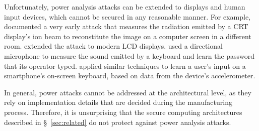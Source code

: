 Unfortunately, power analysis attacks can be extended to displays and human
input devices, which cannot be secured in any reasonable manner. For example,
\cite{van1985monitorpa} documented a very early attack that measures the
radiation emitted by a CRT display's ion beam to reconstitute the image on a
computer screen in a different room. \cite{kuhn2005lcdpa} extended the attack
to modern LCD displays. \cite{zhuang2009keyboard} used a directional microphone
to measure the sound emitted by a keyboard and learn the password that its
operator typed. \cite{owusu2012accessory} applied similar techniques to learn a
user's input on a smartphone's on-screen keyboard, based on data from the
device's accelerometer.

In general, power attacks cannot be addressed at the architectural level, as
they rely on implementation details that are decided during the manufacturing
process. Therefore, it is unsurprising that the secure computing architectures
described in \S~\ref{sec:related} do not protect against power analysis
attacks.
